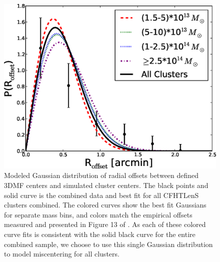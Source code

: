 \begin{figure}
\begin{center}
\includegraphics[scale=0.6]{plots_ch3/PofRc_bestfit_python.eps}
\caption[Centroid Offset Model]{Modeled Gaussian distribution of radial offsets between defined 3DMF centers and simulated cluster centers. The black points and solid curve is the combined data and best fit for all CFHTLenS clusters combined. The colored curves show the best fit Gaussians for separate mass bins, and colors match the empirical offsets measured and presented in Figure 13 of \citet{Milkeraitis10}. As each of these colored curve fits is consistent with the solid black curve for the entire combined sample, we choose to use this single Gaussian distribution to model miscentering for all clusters.}
\label{gauss}
\end{center}
\end{figure}

\begin{table}
  \begin{center}
    \caption[Centroid Offset Fit Parameters]{Best Fit Gaussian Distributions for the Cluster Miscentering in Figure \ref{gauss}.}
  \end{center}
\end{table}

